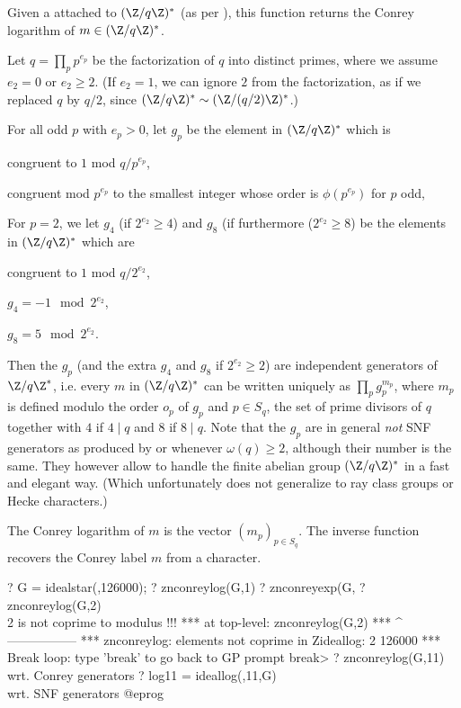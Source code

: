 \label{se:znconreylog}
Given a  attached to $(\Z/q\Z)^*$ (as per
), this function returns the Conrey logarithm of
$m \in (\Z/q\Z)^*$.

Let $q = \prod_p p^{e_p}$ be the factorization of $q$ into distinct primes,
where we assume $e_2 = 0$ or $e_2 \geq 2$. (If $e_2 = 1$, we can ignore $2$
from the factorization, as if we replaced $q$ by $q/2$, since $(\Z/q\Z)^*
\sim (\Z/(q/2)\Z)^*$.)

For all odd  $p$ with $e_p > 0$, let $g_p$ be the element in $(\Z/q\Z)^*$
which is

\item congruent to $1$ mod $q/p^{e_p}$,

\item congruent mod $p^{e_p}$ to the smallest integer whose order
is $\phi(p^{e_p})$ for $p$ odd,

For $p = 2$, we let $g_4$ (if $2^{e_2} \geq 4$) and $g_8$ (if furthermore
($2^{e_2} \geq 8$) be the elements in $(\Z/q\Z)^*$ which
are

\item congruent to $1$ mod $q/2^{e_2}$,

\item $g_4 = -1 \mod 2^{e_2}$,

\item $g_8 = 5 \mod 2^{e_2}$.

Then the $g_p$ (and the extra $g_4$ and $g_8$ if $2^{e_2}\geq 2$) are
independent
generators of $\Z/q\Z^*$, i.e. every $m$ in $(\Z/q\Z)^*$ can be written
uniquely as $\prod_p g_p^{m_p}$, where $m_p$ is defined modulo the
order $o_p$ of $g_p$
and $p \in S_q$, the set of prime divisors of $q$ together with $4$
if $4 \mid q$ and $8$ if $8 \mid q$.
Note that the $g_p$ are in general \emph{not} SNF
generators as produced by  or  whenever
$\omega(q) \geq 2$, although their number is the same. They however allow
to handle the finite abelian group $(\Z/q\Z)^*$ in a fast and elegant
way. (Which unfortunately does not generalize to ray class groups or Hecke
characters.)

The Conrey logarithm of $m$ is the vector $(m_p)_{p\in S_q}$. The inverse
function  recovers the Conrey label $m$ from a character.

\bprog
? G = idealstar(,126000);
? znconreylog(G,1)
? znconreyexp(G, %
? znconreylog(G,2)  \\ 2 is not coprime to modulus !!!
  ***   at top-level: znconreylog(G,2)
  ***                 ^-----------------
  *** znconreylog: elements not coprime in Zideallog:
    2
    126000
  ***   Break loop: type 'break' to go back to GP prompt
break>
? znconreylog(G,11) \\ wrt. Conrey generators
? log11 = ideallog(,11,G)   \\ wrt. SNF generators
@eprog\noindent

